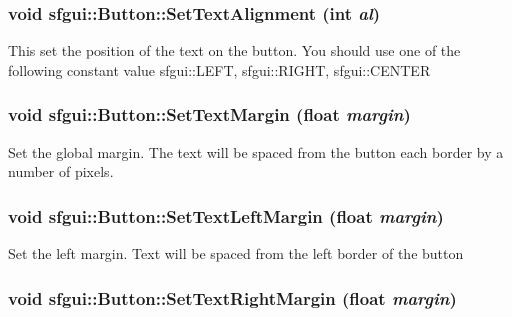 \hypertarget{classsfgui_1_1Button_c1c0fe577ad7bfa1367ad406ae087bd1}{
\subsubsection[SetTextAlignment]{\setlength{\rightskip}{0pt plus 5cm}void sfgui::Button::SetTextAlignment (int {\em al})}}
\label{classsfgui_1_1Button_c1c0fe577ad7bfa1367ad406ae087bd1}




This set the position of the text on the button. You should use one of the following constant value sfgui::LEFT, sfgui::RIGHT, sfgui::CENTER \hypertarget{classsfgui_1_1Button_af84ec76e02e12c55667b960d80cc90b}{
\subsubsection[SetTextMargin]{\setlength{\rightskip}{0pt plus 5cm}void sfgui::Button::SetTextMargin (float {\em margin})}}
\label{classsfgui_1_1Button_af84ec76e02e12c55667b960d80cc90b}




Set the global margin. The text will be spaced from the button each border by a number of pixels. \hypertarget{classsfgui_1_1Button_94b8976462b04b1a0e63542dd49aa7c8}{
\subsubsection[SetTextLeftMargin]{\setlength{\rightskip}{0pt plus 5cm}void sfgui::Button::SetTextLeftMargin (float {\em margin})}}
\label{classsfgui_1_1Button_94b8976462b04b1a0e63542dd49aa7c8}




Set the left margin. Text will be spaced from the left border of the button \hypertarget{classsfgui_1_1Button_4a4b4c339d001a0578c5e70b01ef164b}{
\subsubsection[SetTextRightMargin]{\setlength{\rightskip}{0pt plus 5cm}void sfgui::Button::SetTextRightMargin (float {\em margin})}}
\label{classsfgui_1_1Button_4a4b4c339d001a0578c5e70b01ef164b}





